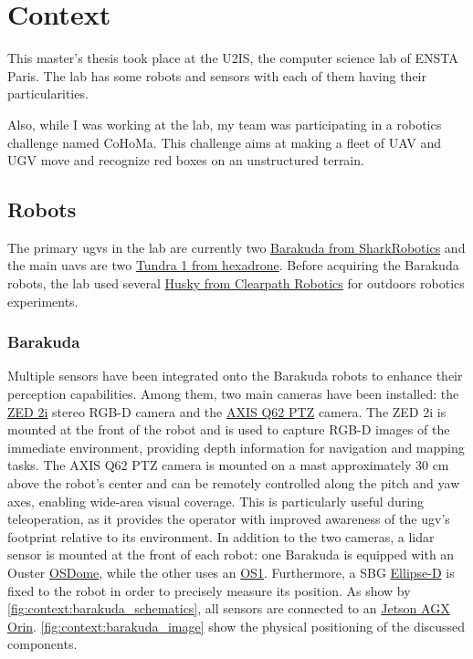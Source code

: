\chapter{Context}\label{ch:context}

This master's thesis took place at the U2IS, the computer science lab of ENSTA Paris.
The lab has some robots and sensors with each of them having their particularities.

Also, while I was working at the lab, my team was participating in a robotics challenge named CoHoMa.
This challenge aims at making a fleet of UAV and UGV move and recognize red boxes on an unstructured terrain.


\section{Robots}\label{sec:robots}

The primary \gls{ugv}s in the lab are currently two \href{https://www.shark-robotics.com/robots/barakuda-mule-robot}{Barakuda from SharkRobotics}
and the main \gls{uav}s are two \href{https://www.hexadrone.fr/produits/drone-tundra/}{Tundra 1 from hexadrone}.
Before acquiring the Barakuda robots, the lab used several
\href{https://clearpathrobotics.com/husky-a300-unmanned-ground-vehicle-robot/}{Husky from Clearpath Robotics} for
outdoors robotics experiments.

\subsection{Barakuda}\label{subsec:barakuda}

Multiple sensors have been integrated onto the Barakuda robots to enhance their perception capabilities.
Among them, two main cameras have been installed: the \href{https://www.stereolabs.com/en-fr/products/zed-2}{ZED 2i} stereo RGB-D camera and the \href{https://www.axis.com/products/axis-q62-series}{AXIS Q62 PTZ} camera.
The ZED 2i is mounted at the front of the robot and is used to capture RGB-D images of the immediate environment, providing depth information for navigation and mapping tasks.
The AXIS Q62 PTZ camera is mounted on a mast approximately 30 cm above the robot's center and can be remotely controlled along the pitch and yaw axes, enabling wide-area visual coverage.
This is particularly useful during teleoperation, as it provides the operator with improved awareness of the \gls{ugv}'s footprint relative to its environment.
In addition to the two cameras, a \gls{lidar} sensor is mounted at the front of each robot: one Barakuda is equipped with an Ouster \href{https://ouster.com/products/hardware/osdome-lidar-sensor}{OSDome},
while the other uses an \href{https://ouster.com/products/hardware/os1-lidar-sensor}{OS1}.
Furthermore, a SBG \href{https://www.sbg-systems.com/ins/ellipse-d/}{Ellipse-D} is fixed to the robot in order to precisely measure its position.
As show by \cref{fig:context:barakuda_schematics}, all sensors are connected to an \href{https://www.nvidia.com/en-us/autonomous-machines/embedded-systems/jetson-orin/#nv-title-8b7137e4b5}{Jetson AGX Orin}.
\cref{fig:context:barakuda_image} show the physical positioning of the discussed components.


